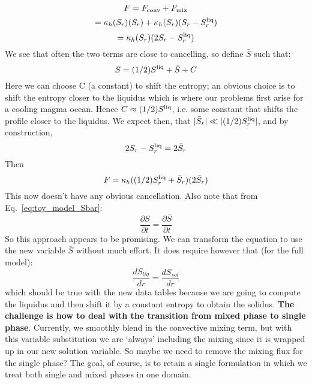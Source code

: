 \begin{equation}
F = F_{\rm conv} + F_{\rm mix} 
\end{equation}
\begin{equation}
 = \kappa_h(S_r)(S_r) + \kappa_h(S_r)(S_r - S^{\rm liq}_r)
\end{equation}
\begin{equation}
 = \kappa_h(S_r)(2S_r - S^{\rm liq}_r)
\end{equation}
We see that often the two terms are close to cancelling, so define $\bar S$ such that:
\begin{equation}
S = (1/2)S^{\rm liq} + \bar S + C
\label{eq:toy_model_Sbar}
\end{equation}
Here we can choose C (a constant) to shift the entropy; an obvious choice is to shift the entropy closer to the liquidus which is where our problems first arise for a cooling magma ocean.  Hence $C \approx (1/2) S^{\rm liq}$, i.e. some constant that shifts the profile closer to the liquidus.
We expect then, that $|\bar S_r| \ll | (1/2)S^{\rm liq}_r |$, and by construction,
\begin{equation}
2S_r - S^{\rm liq}_r = 2\bar S_r
\end{equation}
Then
\begin{equation}
F = \kappa_h((1/2)S^{\rm liq}_r + \bar S_r) (2 \bar S_r)
\end{equation}
This now doesn't have any obvious cancellation.  Also note that from Eq.~\ref{eq:toy_model_Sbar}:
\begin{equation}
\frac{\partial S}{\partial t} = \frac{\partial \bar S}{\partial t}
\end{equation}
So this approach appears to be promising.  We can transform the equation to use the new variable $\bar{S}$ without much effort.  It does require however that (for the full model):
\begin{equation}
\frac{d S_{liq}}{dr} = \frac{d S_{sol}}{dr}
\end{equation}
which should be true with the new data tables because we are going to compute the liquidus and then shift it by a constant entropy to obtain the solidus.  \textbf{The challenge is how to deal with the transition from mixed phase to single phase}.  Currently, we smoothly blend in the convective mixing term, but with this variable substitution we are `always' including the mixing since it is wrapped up in our new solution variable.  So maybe we need to remove the mixing flux for the single phase?  The goal, of course, is to retain a single formulation in which we treat both single and mixed phases in one domain.
